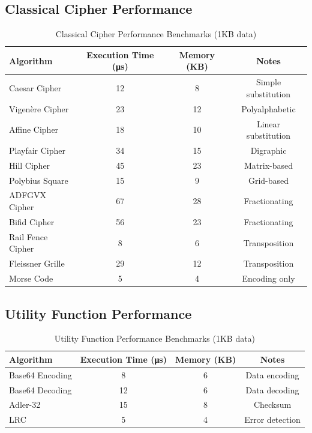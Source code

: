 \documentclass[12pt,a4paper]{article}
\begin{document}
\subsection{Classical Cipher Performance}

\begin{table}[h]
\centering
\caption{Classical Cipher Performance Benchmarks (1KB data)}
\begin{tabular}{|l|c|c|c|}
\hline
\textbf{Algorithm} & \textbf{Execution Time (μs)} & \textbf{Memory (KB)} & \textbf{Notes} \\
\hline
Caesar Cipher & 12 & 8 & Simple substitution \\
Vigenère Cipher & 23 & 12 & Polyalphabetic \\
Affine Cipher & 18 & 10 & Linear substitution \\
Playfair Cipher & 34 & 15 & Digraphic \\
Hill Cipher & 45 & 23 & Matrix-based \\
Polybius Square & 15 & 9 & Grid-based \\
ADFGVX Cipher & 67 & 28 & Fractionating \\
Bifid Cipher & 56 & 23 & Fractionating \\
Rail Fence Cipher & 8 & 6 & Transposition \\
Fleissner Grille & 29 & 12 & Transposition \\
Morse Code & 5 & 4 & Encoding only \\
\hline
\end{tabular}
\end{table}

\subsection{Utility Function Performance}

\begin{table}[h]
\centering
\caption{Utility Function Performance Benchmarks (1KB data)}
\begin{tabular}{|l|c|c|c|}
\hline
\textbf{Algorithm} & \textbf{Execution Time (μs)} & \textbf{Memory (KB)} & \textbf{Notes} \\
\hline
Base64 Encoding & 8 & 6 & Data encoding \\
Base64 Decoding & 12 & 6 & Data decoding \\
Adler-32 & 15 & 8 & Checksum \\
LRC & 5 & 4 & Error detection \\
\hline
\end{tabular}
\end{table}
\end{document}
